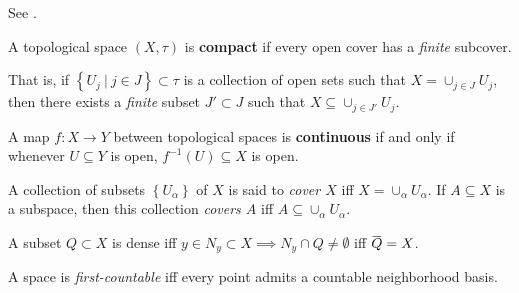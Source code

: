 \begin{definition}

See \autocite{def:open_closed_maps}.

\end{definition}

\begin{definition}[Compact]

A topological space \((X, \tau)\) is \textbf{compact} if every open
cover has a \emph{finite} subcover.

That is, if
\(\left\{{U_{j} {~\mathrel{\Big|}~}j\in J}\right\} \subset \tau\) is a
collection of open sets such that \(X = \cup_{j\in J} U_{j}\), then
there exists a \emph{finite} subset \(J' \subset J\) such that
\(X \subseteq \cup_{j\in J'} U_{j}\).

\end{definition}

\begin{definition}

A map \(f:X\to Y\) between topological spaces is \textbf{continuous} if
and only if whenever \(U \subseteq Y\) is open,
\(f ^{-1} (U) \subseteq X\) is open.

\end{definition}

\begin{definition}[Cover]

A collection of subsets \(\left\{{U_\alpha}\right\}\) of \(X\) is said
to \emph{cover \(X\)} iff \(X = \cup_{\alpha} U_\alpha\). If
\(A\subseteq X\) is a subspace, then this collection \emph{covers \(A\)}
iff \(A\subseteq \cup_{\alpha} U_\alpha\).

\end{definition}

\begin{definition}[Dense]

A subset \(Q\subset X\) is dense iff
\(y\in N_{y} \subset X \implies N_{y} \cap Q \neq \emptyset\) iff
\(\mkern 1.5mu\overline{\mkern-1.5muQ\mkern-1.5mu}\mkern 1.5mu = X\).

\end{definition}

\begin{definition}

A space is \emph{first-countable} iff every point admits a countable
neighborhood basis.

\end{definition}

